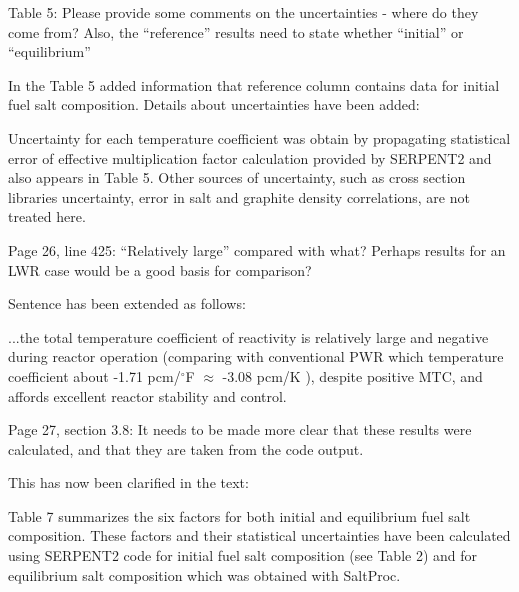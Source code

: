 \documentclass[answers,11pt]{exam}
\begin{document}
\begin{questions}
        \question  Table 5: Please provide some comments on the uncertainties - 
        where do they come from? Also, the ``reference'' results need to state 
        whether ``initial'' or ``equilibrium''
        \begin{solution}
                In the Table 5 added information that reference column contains data for initial 					fuel salt composition. Details about uncertainties have been added:
                
                 Uncertainty for each temperature coefficient was obtain by 
                 propagating statistical error of effective multiplication factor 
                 calculation provided by SERPENT2 and also appears in Table 5. 
                 Other sources of uncertainty, such as cross section libraries 
				 uncertainty, error in salt and graphite density correlations, 
				 are not treated here.
        \end{solution}

        \question  Page 26, line 425: ``Relatively large'' compared with what? 
        Perhaps results for an LWR case would be a good basis for comparison?
        \begin{solution}
                Sentence has been extended as follows:
                
                ...the total temperature coefficient of reactivity is relatively large and
                 negative during reactor operation (comparing with conventional PWR which 							temperature coefficient about -1.71 pcm/$^\circ$F $\approx$ -3.08 pcm/K 							\cite{forget_integral_2018}), despite positive MTC, and affords excellent 
                 reactor stability and control.
        \end{solution}

        \question  Page 27, section 3.8: It needs to be made more clear that 
        these results were calculated, and that they are taken from the code 
        output.
        \begin{solution}
                This has now been clarified in the text:
                
                Table 7 summarizes the six factors for both initial and 
				equilibrium fuel salt composition. These factors and their statistical 								uncertainties have been calculated using SERPENT2 code for initial fuel salt 
				composition (see Table 2) and for equilibrium salt composition which was 
				obtained with SaltProc. 
        \end{solution}


\end{questions}
\end{document}
